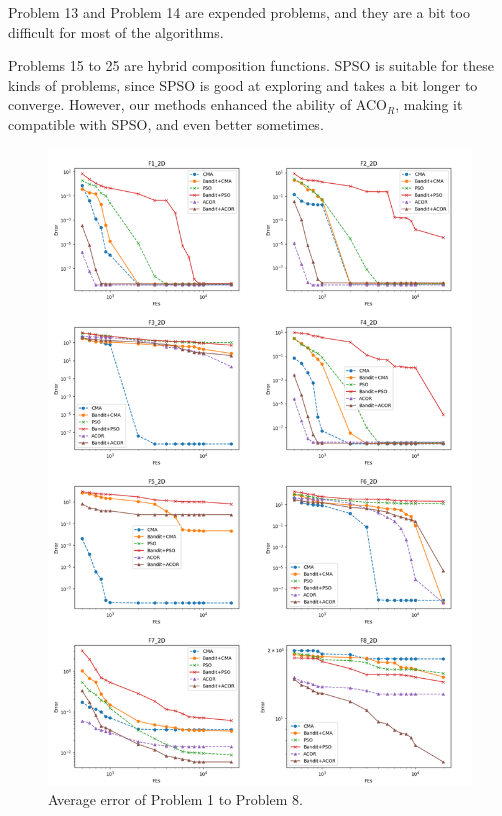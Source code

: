 Problem 13 and Problem 14 are expended problems, and they are a bit too difficult for most of the algorithms.

Problems 15 to 25 are hybrid composition functions.
SPSO is suitable for these kinds of problems, since SPSO is good at exploring and takes a bit longer to converge.
However, our methods enhanced the ability of ACO$_R$, making it compatible with SPSO, and even better sometimes.



\begin{figure}
\centering
\includegraphics[width=\textwidth]{Average_F1_F8}
\caption{Average error of Problem 1 to Problem 8.}\label{fig:Average_F1_F8}
\end{figure}

